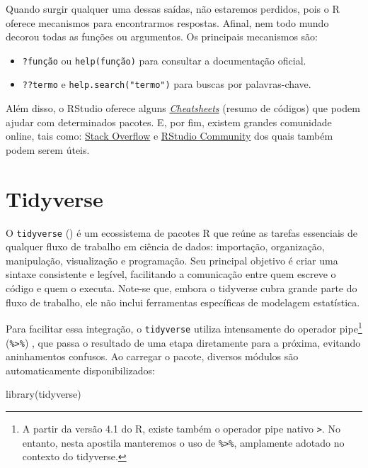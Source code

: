 \documentclass[
  12pt,
  letterpaper,
  DIV=11,
  numbers=noendperiod]{scrreprt}
\newenvironment{Shaded}{\begin{snugshade}}{\end{snugshade}}
\newcommand{\FunctionTok}[1]{\textcolor[rgb]{0.28,0.35,0.67}{#1}}
\newcommand{\NormalTok}[1]{\textcolor[rgb]{0.00,0.23,0.31}{#1}}
\providecommand{\tightlist}{%
  \setlength{\itemsep}{0pt}\setlength{\parskip}{0pt}}\usepackage{longtable,booktabs,array}
\theoremstyle{definition}
\theoremstyle{exemplo}
\begin{document}
Quando surgir qualquer uma dessas saídas, não estaremos perdidos, pois o
R oferece mecanismos para encontrarmos respostas. Afinal, nem todo mundo
decorou todas as funções ou argumentos. Os principais mecanismos são:

\begin{itemize}
\tightlist
\item
  \texttt{?função} ou \texttt{help(função)} para consultar a
  documentação oficial.
\item
  \texttt{??termo} e \texttt{help.search("termo")} para buscas por
  palavras-chave.
\end{itemize}

Além disso, o RStudio oferece alguns
\href{https://rstudio.com/resources/cheatsheets/}{\emph{Cheatsheets}}
(resumo de códigos) que podem ajudar com determinados pacotes. E, por
fim, existem grandes comunidade online, tais como:
\href{https://stackoverflow.com/collectives/r-language}{Stack Overflow}
e \href{https://forum.posit.co/}{RStudio Community} dos quais também
podem serem úteis.


\chapter{Tidyverse}\label{tidyverse}

O \texttt{tidyverse} () é um ecossistema de pacotes R que reúne as tarefas
essenciais de qualquer fluxo de trabalho em ciência de dados:
importação, organização, manipulação, visualização e programação. Seu
principal objetivo é criar uma sintaxe consistente e legível,
facilitando a comunicação entre quem escreve o código e quem o executa.
Note-se que, embora o tidyverse cubra grande parte do fluxo de trabalho,
ele não inclui ferramentas específicas de modelagem estatística.

Para facilitar essa integração, o \texttt{tidyverse} utiliza
intensamente do operador pipe\footnote{A partir da versão 4.1 do R,
  existe também o operador pipe nativo
  \texttt{\textbar{}\textgreater{}}. No entanto, nesta apostila
  manteremos o uso de \texttt{\%\textgreater{}\%}, amplamente adotado no
  contexto do tidyverse.} (\texttt{\%\textgreater{}\%}) , que passa o
resultado de uma etapa diretamente para a próxima, evitando aninhamentos
confusos. Ao carregar o pacote, diversos módulos são automaticamente
disponibilizados:

\begin{Shaded}
\begin{Highlighting}[]
\FunctionTok{library}\NormalTok{(tidyverse)}
\end{Highlighting}
\end{Shaded}
\end{document}
